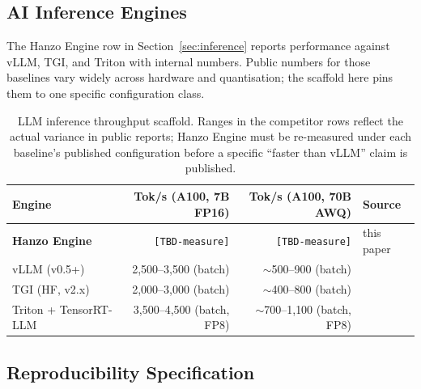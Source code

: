 \subsection{AI Inference Engines}

The Hanzo Engine row in Section~\ref{sec:inference} reports performance
against vLLM, TGI, and Triton with internal numbers. Public numbers for
those baselines vary widely across hardware and quantisation; the scaffold
here pins them to one specific configuration class.

\begin{table}[H]
\centering
\small
\begin{tabular}{@{}lrrl@{}}
\toprule
\textbf{Engine} & \textbf{Tok/s (A100, 7B FP16)} & \textbf{Tok/s (A100, 70B AWQ)} & \textbf{Source} \\
\midrule
\textbf{Hanzo Engine}   & \texttt{[TBD-measure]}                & \texttt{[TBD-measure]}                & this paper \\
\midrule
vLLM (v0.5+)            & 2{,}500--3{,}500 (batch)              & $\sim$500--900 (batch)                & \cite{vllmrepo,vllmpaper} \\
TGI (HF, v2.x)          & 2{,}000--3{,}000 (batch)              & $\sim$400--800 (batch)                & \cite{tgirepo} \\
Triton + TensorRT-LLM   & 3{,}500--4{,}500 (batch, FP8)         & $\sim$700--1{,}100 (batch, FP8)       & \cite{tensorrtllm} \\
\bottomrule
\end{tabular}
\caption{LLM inference throughput scaffold. Ranges in the competitor rows
reflect the actual variance in public reports; Hanzo Engine must be
re-measured under each baseline's published configuration before a
specific ``faster than vLLM'' claim is published.}
\label{tab:hanzo-engine-scaffold}
\end{table}

\subsection{Reproducibility Specification}
\label{sec:hanzo-repro}

